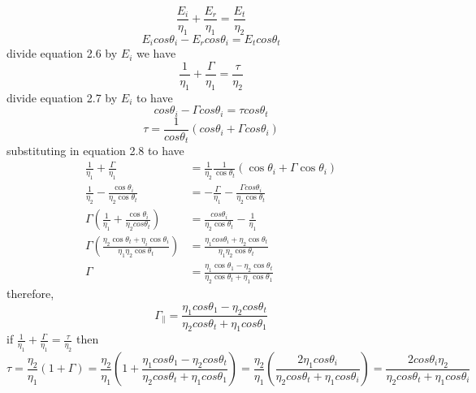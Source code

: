 \begin{equation}
\frac{E_{i}}{\eta_{1}} + \frac{E_{r}}{\eta_{1}} = \frac{E_{t}}{\eta_{2}}
\end{equation}
\begin{equation}
E_{i} cos\theta_{i} - E_{r} cos\theta_{i} = E_{t} cos\theta_{t}
\end{equation}
divide equation 2.6 by $E_{i}$ we have
\begin{equation}
\frac{1}{\eta_{1}} + \frac{\Gamma}{\eta_{1}} = \frac{\tau}{\eta_{2}}
\end{equation}
divide equation 2.7 by $E_{i}$ to have
\begin{equation}
cos\theta_{i} - \Gamma cos\theta_{i} = \tau cos\theta_{t}
\end{equation}
\begin{equation*}
\tau = \frac{1}{cos\theta_{t}} (cos\theta_{i} + \Gamma cos\theta_{i})
\end{equation*}
substituting in equation 2.8 to have
\begin{align*}
\frac{1}{\eta_{1}} + \frac{\Gamma}{\eta_{1}} &= \frac{1}{\eta_{2}} \frac{1}{\cos\theta_{t}} (\cos\theta_{i} + \Gamma \cos\theta_{i})\\
\frac{1}{\eta_{2}} - \frac{\cos\theta_{i}}{\eta_{2} \cos\theta_{t}} &= - \frac{\Gamma}{\eta_{1}} - \frac{\Gamma cos\theta_{i}}{\eta_{2} \cos\theta_{t}}\\
\Gamma \left(\frac{1}{\eta_{1}} + \frac{\cos\theta_{i}}{\eta_{2} cos\theta_{t}}\right) &= \frac{cos\theta_{i}}{\eta_{2} \cos\theta_{t}} - \frac{1}{\eta_{1}}\\
\Gamma \left(\frac{\eta_{2} \cos\theta_{t} + \eta_{i} \cos\theta_{i}}{\eta_{1} \eta_{2} \cos\theta_{t}}\right) &= \frac{\eta_{1} cos\theta_{i} + \eta_{2} \cos\theta_{t}}{\eta_{1} \eta_{2} \cos\theta_{t}}\\
\Gamma &= \frac{\eta_{1} \cos\theta_{1} - \eta_{2} \cos\theta_{t}}{\eta_{2} \cos\theta_{t} + \eta_{1} \cos\theta_{1}}
\end{align*}
therefore,
\begin{dmath}
\Gamma_{\parallel} = \frac{\eta_{1} cos\theta_{1} - \eta_{2} cos\theta_{t}}{\eta_{2} cos\theta_{t} + \eta_{1} cos\theta_{1}}
\end{dmath}
if $\frac{1}{\eta_{1}} + \frac{\Gamma}{\eta_{1}} = \frac{\tau}{\eta_{2}}$ then 
\begin{dmath*}
\tau = \frac{\eta_{2}}{\eta_{1}} (1 + \Gamma)
= \frac{\eta_{2}}{\eta_{1}} (1 + \frac{\eta_{1} cos\theta_{1} - \eta_{2} cos\theta_{t}}{\eta_{2} cos\theta_{t} + \eta_{1} cos\theta_{1}})
= \frac{\eta_{2}}{\eta_{1}} (\frac{2\eta_{1} cos\theta_{i}}{\eta_{2} cos\theta_{t} + \eta_{1} cos\theta_{i}})
= \frac{2 cos\theta_{i} \eta_{2}}{\eta_{2} cos\theta_{t} + \eta_{1} cos\theta_{i}}
\end{dmath*}

